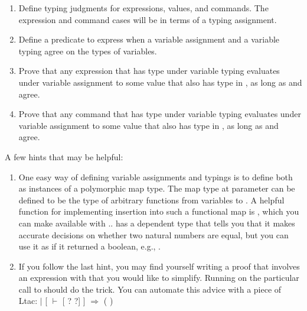 \documentclass[12pt]{report}
\begin{document}
\begin{enumerate}
\begin{enumerate}
    \item Define typing judgments for expressions, values, and commands.  The expression and command cases will be in terms of a typing assignment.
    \item Define a predicate  to express when a variable assignment and a variable typing agree on the types of variables.
    \item Prove that any expression that has type  under variable typing  evaluates under variable assignment  to some value that also has type  in , as long as  and  agree.
    \item Prove that any command that has type  under variable typing  evaluates under variable assignment  to some value that also has type  in , as long as  and  agree.
  \end{enumerate}
  A few hints that may be helpful:
  \begin{enumerate}
    \item One easy way of defining variable assignments and typings is to define both as instances of a polymorphic map type.  The map type at parameter  can be defined to be the type of arbitrary functions from variables to .  A helpful function for implementing insertion into such a functional map is , which you can make available with   ..   has a dependent type that tells you that it makes accurate decisions on whether two natural numbers are equal, but you can use it as if it returned a boolean, e.g.,        .
    \item If you follow the last hint, you may find yourself writing a proof that involves an expression with  that you would like to simplify.  Running  on the particular call to  should do the trick.  You can automate this advice with a piece of Ltac: \coqdoceol
\coqdocemptyline
\coqdocnoindent
{}  \coqdoceol
\coqdocindent{1.00em}
\ensuremath{|} [ \ensuremath{\vdash} [ ? ?] ] \ensuremath{\Rightarrow}  (  )\coqdoceol
\coqdocnoindent
{}


\end{enumerate}
\end{enumerate}
\end{document}
